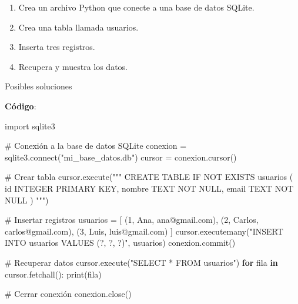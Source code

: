 \documentclass[
  a4paper,
  DIV=11,
  numbers=noendperiod,
  onepage,
  openany]{scrreprt}
\newenvironment{Shaded}{\begin{snugshade}}{\end{snugshade}}
\newcommand{\BuiltInTok}[1]{\textcolor[rgb]{0.00,0.23,0.31}{#1}}
\newcommand{\CommentTok}[1]{\textcolor[rgb]{0.37,0.37,0.37}{#1}}
\newcommand{\ControlFlowTok}[1]{\textcolor[rgb]{0.00,0.23,0.31}{\textbf{#1}}}
\newcommand{\DecValTok}[1]{\textcolor[rgb]{0.68,0.00,0.00}{#1}}
\newcommand{\ExtensionTok}[1]{\textcolor[rgb]{0.00,0.23,0.31}{#1}}
\newcommand{\ImportTok}[1]{\textcolor[rgb]{0.00,0.46,0.62}{#1}}
\newcommand{\KeywordTok}[1]{\textcolor[rgb]{0.00,0.23,0.31}{\textbf{#1}}}
\newcommand{\NormalTok}[1]{\textcolor[rgb]{0.00,0.23,0.31}{#1}}
\newcommand{\OperatorTok}[1]{\textcolor[rgb]{0.37,0.37,0.37}{#1}}
\newcommand{\StringTok}[1]{\textcolor[rgb]{0.13,0.47,0.30}{#1}}
\begin{document}
\begin{enumerate}
\def\labelenumi{\arabic{enumi}.}
\item
  Crea un archivo Python que conecte a una base de datos SQLite.
\item
  Crea una tabla llamada usuarios.
\item
  Inserta tres registros.
\item
  Recupera y muestra los datos.
\end{enumerate}

Posibles soluciones

\textbf{Código}:

\begin{Shaded}
\begin{Highlighting}[]
\ImportTok{import}\NormalTok{ sqlite3}

\CommentTok{\# Conexión a la base de datos SQLite}
\NormalTok{conexion }\OperatorTok{=}\NormalTok{ sqlite3.}\ExtensionTok{connect}\NormalTok{(}\StringTok{"mi\_base\_datos.db"}\NormalTok{)}
\NormalTok{cursor }\OperatorTok{=}\NormalTok{ conexion.cursor()}

\CommentTok{\# Crear tabla}
\NormalTok{cursor.execute(}\StringTok{"""}
\StringTok{CREATE TABLE IF NOT EXISTS usuarios (}
\StringTok{    id INTEGER PRIMARY KEY,}
\StringTok{    nombre TEXT NOT NULL,}
\StringTok{    email TEXT NOT NULL}
\StringTok{)}
\StringTok{"""}\NormalTok{)}

\CommentTok{\# Insertar registros}
\NormalTok{usuarios }\OperatorTok{=}\NormalTok{ [}
\NormalTok{    (}\DecValTok{1}\NormalTok{, }\StringTok{\textquotesingle{}Ana\textquotesingle{}}\NormalTok{, }\StringTok{\textquotesingle{}ana@gmail.com\textquotesingle{}}\NormalTok{),}
\NormalTok{    (}\DecValTok{2}\NormalTok{, }\StringTok{\textquotesingle{}Carlos\textquotesingle{}}\NormalTok{, }\StringTok{\textquotesingle{}carlos@gmail.com\textquotesingle{}}\NormalTok{),}
\NormalTok{    (}\DecValTok{3}\NormalTok{, }\StringTok{\textquotesingle{}Luis\textquotesingle{}}\NormalTok{, }\StringTok{\textquotesingle{}luis@gmail.com\textquotesingle{}}\NormalTok{)}
\NormalTok{]}
\NormalTok{cursor.executemany(}\StringTok{"INSERT INTO usuarios VALUES (?, ?, ?)"}\NormalTok{, usuarios)}
\NormalTok{conexion.commit()}

\CommentTok{\# Recuperar datos}
\NormalTok{cursor.execute(}\StringTok{"SELECT * FROM usuarios"}\NormalTok{)}
\ControlFlowTok{for}\NormalTok{ fila }\KeywordTok{in}\NormalTok{ cursor.fetchall():}
    \BuiltInTok{print}\NormalTok{(fila)}

\CommentTok{\# Cerrar conexión}
\NormalTok{conexion.close()}
\end{Highlighting}
\end{Shaded}
\end{document}
